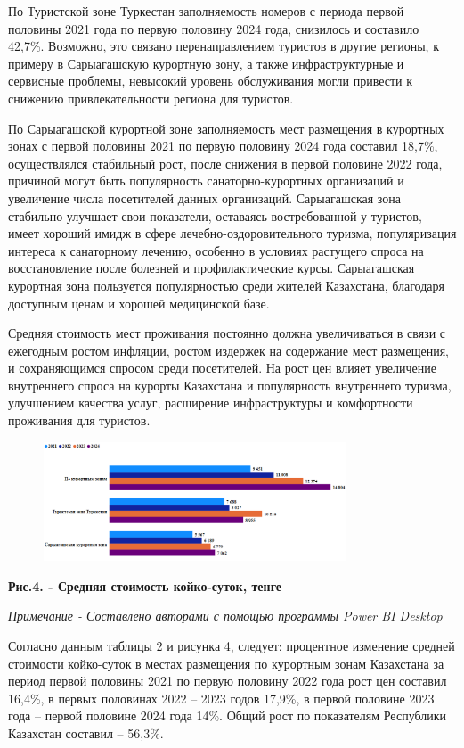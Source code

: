 По Туристской зоне Туркестан заполняемость номеров с периода первой
половины 2021 года по первую половину 2024 года, снизилось и составило
42,7\%. Возможно, это связано перенаправлением туристов в другие
регионы, к примеру в Сарыагашскую курортную зону, а также
инфраструктурные и сервисные проблемы, невысокий уровень обслуживания
могли привести к снижению привлекательности региона для туристов.

По Сарыагашской курортной зоне заполняемость мест размещения в курортных
зонах с первой половины 2021 по первую половину 2024 года составил
18,7\%, осуществлялся стабильный рост, после снижения в первой половине
2022 года, причиной могут быть популярность санаторно-курортных
организаций и увеличение числа посетителей данных организаций.
Сарыагашская зона стабильно улучшает свои показатели, оставаясь
востребованной у туристов, имеет хороший имидж в сфере
лечебно-оздоровительного туризма, популяризация интереса к санаторному
лечению, особенно в условиях растущего спроса на восстановление после
болезней и профилактические курсы. Сарыагашская курортная зона
пользуется популярностью среди жителей Казахстана, благодаря доступным
ценам и хорошей медицинской базе.

Средняя стоимость мест проживания постоянно должна увеличиваться в связи
с ежегодным ростом инфляции, ростом издержек на содержание мест
размещения, и сохраняющимся спросом среди посетителей. На рост цен
влияет увеличение внутреннего спроса на курорты Казахстана и
популярность внутреннего туризма, улучшением качества услуг, расширение
инфраструктуры и комфортности проживания для туристов.


\begin{figure}[H]
	\centering
	\includegraphics[width=0.8\textwidth]{media/ekon2/image6}
	\caption*{}
\end{figure}


{\bfseries Рис.4. - Средняя стоимость койко-суток, тенге}

\emph{Примечание - Составлено авторами с помощью программы Power BI
Desktop}

Согласно данным таблицы 2 и рисунка 4, следует: процентное изменение
средней стоимости койко-суток в местах размещения по курортным зонам
Казахстана за период первой половины 2021 по первую половину 2022 года
рост цен составил 16,4\%, в первых половинах 2022 -- 2023 годов 17,9\%,
в первой половине 2023 года -- первой половине 2024 года 14\%. Общий
рост по показателям Республики Казахстан составил -- 56,3\%.

